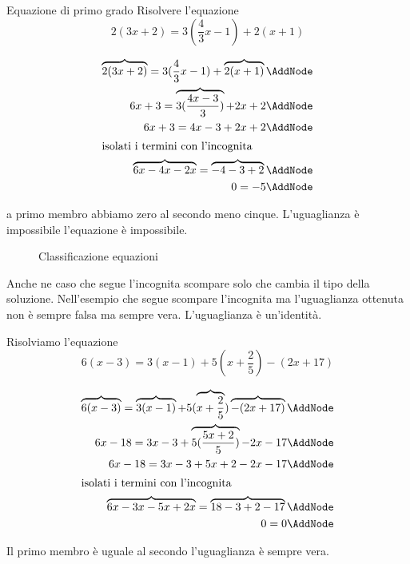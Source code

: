 \begin{esempiot}{Equazione di primo grado}{}
Risolvere l'equazione \[2(3x+2)=3(\dfrac{4}{3}x-1)+2(x+1) \]
\end{esempiot}
 \begin{NodesList}[margin=3cm]
  \begin{align*}
\overbrace{2(3x+2)}=3(\dfrac{4}{3}x-1)+\overbrace{2(x+1)} \AddNode\\
6x+3=\overbrace{3(\dfrac{4x-3}{3})}+2x+2 \AddNode\\
 6x+3=4x-3+2x+2  \AddNode\\
  \intertext{\hfil isolati i termini con l'incognita \hfil}
 \overbrace{6x-4x-2x}=\overbrace{-4-3+2}  \AddNode\\
 0=-5\AddNode
  \end{align*}
  \end{NodesList}
  a  primo membro abbiamo zero al secondo meno cinque. L'uguaglianza è impossibile l'equazione è impossibile.
\begin{figure}
	\centering
	
	\caption[]{Classificazione equazioni}
	\label{fig:AlberoBinarioeqa1}
\end{figure}

Anche ne caso che segue l'incognita scompare solo che cambia il tipo della soluzione. Nell'esempio che segue scompare l'incognita ma l'uguaglianza ottenuta non è sempre falsa ma sempre vera. L'uguaglianza è un'identità.
\begin{esempiot}{}{}
Risolviamo l'equazione \[ 6(x-3) = 3(x-1)+5(x+\dfrac{2}{5})-(2x+17)\]
\end{esempiot}
\begin{NodesList}[margin=3cm]
  \begin{align*}
\overbrace{6(x-3)} = \overbrace{3(x-1)}+5(\overbrace{x+\dfrac{2}{5}})\overbrace{-(2x+17)} \AddNode\\
6x-18 = 3x-3+\overbrace{5(\dfrac{5x+2}{5})}-2x-17\AddNode\\
6x-18 = 3x-3+5x+2-2x-17  \AddNode\\
  \intertext{\hfil isolati i termini con l'incognita \hfil}
 \overbrace{6x-3x-5x+2x}=\overbrace{18-3+2-17}  \AddNode\\
 0=0\AddNode
  \end{align*}
  \end{NodesList}
  Il primo membro è uguale al secondo l'uguaglianza è sempre vera. 







